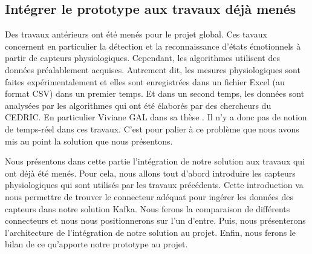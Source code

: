 \documentclass[11pt]{article}
\begin{document}
	\subsection{Intégrer le prototype aux travaux déjà menés}\label{sec:travaux}
		Des travaux antérieurs ont été menés pour le projet global.
		Ces tavaux concernent en particulier la détection et la reconnaissance d'états émotionnels à partir de capteurs physiologiques.
		Cependant, les algorithmes utilisent des données préalablement acquises. 
		Autrement dit, les mesures physiologiques sont faites expérimentalement et elles sont enregistrées dans un fichier Excel (au format CSV) dans un premier temps.
		Et dans un second temps, les données sont analysées par les algorithmes qui ont été élaborés par des chercheurs du CEDRIC.
		En particulier Viviane GAL dans sa thèse \cite{gal_2019}.
		Il n'y a donc pas de notion de temps-réel dans ces travaux.
		C'est pour palier à ce problème que nous avons mis au point la solution que nous présentons.\par
		Nous présentons dans cette partie l'intégration de notre solution aux travaux qui ont déjà été menés.
		Pour cela, nous allons tout d'abord introduire les capteurs physiologiques qui sont utilisés par les travaux précédents.
		Cette introduction va nous permettre de trouver le connecteur adéquat pour ingérer les données des capteurs dans notre solution Kafka.
		Nous ferons la comparaison de différents connecteurs et nous nous positionnerons sur l'un d'entre.
		Puis, nous présenterons l'architecture de l'intégration de notre solution au projet.
		Enfin, nous ferons le bilan de ce qu'apporte notre prototype au projet.
\end{document}
